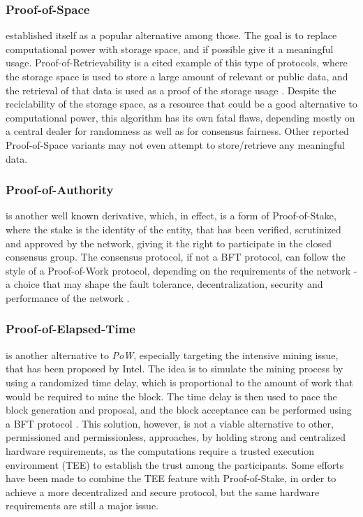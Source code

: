 \documentclass[journal]{IEEEtran}
\begin{document}
\subsubsection{Proof-of-Space} established itself as a popular alternative among those.
The goal is to replace computational power with storage space,
and if possible give it a meaningful usage. Proof-of-Retrievability is
a cited example of this type of protocols, where the storage space is
used to store a large amount of relevant or public data, and the retrieval of that data
is used as a proof of the storage usage \cite{juels2007pors}. Despite the reciclability 
of the storage space, as a resource that could be a good alternative
to computational power, this algorithm has its own fatal flaws, depending
mostly on a central dealer for randomness as well as for consensus fairness.
Other reported Proof-of-Space variants may not even attempt to store/retrieve any meaningful data.

\subsubsection{Proof-of-Authority} is another well known derivative,
which, in effect, is a form of Proof-of-Stake, where the stake is the 
identity of the entity, that has been verified, scrutinized and
approved by the network, giving it the right to participate in the
closed consensus group. The consensus protocol, if not a BFT protocol, 
can follow the style of a Proof-of-Work protocol, depending on the 
requirements of the network - a choice that may shape the fault tolerance,
decentralization, security and performance of the network \cite{survey-dist-consensus}.

\subsubsection{Proof-of-Elapsed-Time} is another alternative to \emph{PoW},
especially targeting the intensive mining issue, that has been proposed 
by Intel. The idea is to simulate the mining process by using a
randomized time delay, which is proportional to the amount of work
that would be required to mine the block. The time delay is then used to pace the
block generation and proposal, and the block acceptance can be performed
using a BFT protocol \cite{olson2018sawtooth}. This solution, however,
is not a viable alternative to other, permissioned and permissionless, approaches, 
by holding strong and centralized hardware requirements, 
as the computations require a trusted execution environment
(TEE) to establish the trust among the participants. Some efforts have been made
to combine the TEE feature with Proof-of-Stake, in order to achieve a
more decentralized and secure protocol, but the 
same hardware requirements are still a major issue.
\end{document}
